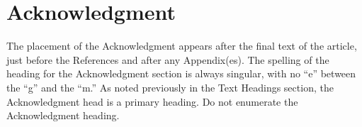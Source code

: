 \section*{Acknowledgment}

The placement of the Acknowledgment appears after the final text of the article, just before the References and after any Appendix(es). The spelling of the heading for the Acknowledgment section is always singular, with no ``e'' between the ``g'' and the ``m.'' As noted previously in the Text Headings section, the Acknowledgment head is a primary heading. Do not enumerate the Acknowledgment heading.
